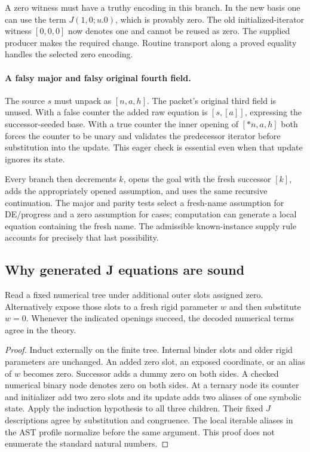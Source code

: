 A zero witness must have a truthy encoding in this branch. In the new
basis one can use the term $J(1,0;u.0)$, which is provably zero. The old
initialized-iterator witness $[0,0,0]$ now denotes one and cannot be reused
as zero. The supplied producer makes the required change. Routine
transport along a proved equality handles the selected zero encoding.

\paragraph{A falsy major and falsy original fourth field.}
The source $s$ must unpack as $[n,a,h]$. The packet's original third
field is unused. With a false counter the added raw equation is
$[s,[a]]$, expressing the successor-seeded base. With a true counter
the inner opening of $[*n,a,h]$ both forces the counter to be unary and
validates the predecessor iterator before substitution into the update.
This eager check is essential even when that update ignores its state.

Every branch then decrements $k$, opens the goal with the fresh successor
$[k]$, adds the appropriately opened assumption, and uses the same
recursive continuation. The major and parity tests select a fresh-name
assumption for DE/progress and a zero assumption for cases; computation
can generate a local equation containing the fresh name. The admissible
known-instance supply rule accounts for precisely that last possibility.

\subsection{Why generated J equations are sound}

\begin{lemma}\label{impl:zero}
Read a fixed numerical tree under additional outer slots assigned zero.
Alternatively expose those slots to a fresh rigid parameter $w$ and then
substitute $w=0$. Whenever the indicated openings succeed, the decoded
numerical terms agree in the theory.
\end{lemma}
\begin{proof}
Induct externally on the finite tree. Internal binder slots and older
rigid parameters are unchanged. An added zero slot, an exposed coordinate,
or an alias of $w$ becomes zero. Successor adds a dummy zero on both
sides. A checked numerical binary node denotes zero on both sides.
At a ternary node its counter and initializer add two zero slots and its
update adds two aliases of one symbolic state. Apply the induction
hypothesis to all three children. Their fixed $J$ descriptions agree by
substitution and congruence. The local iterable aliases in the AST profile
normalize before the same argument. This proof does not enumerate the
standard natural numbers.
\end{proof}

